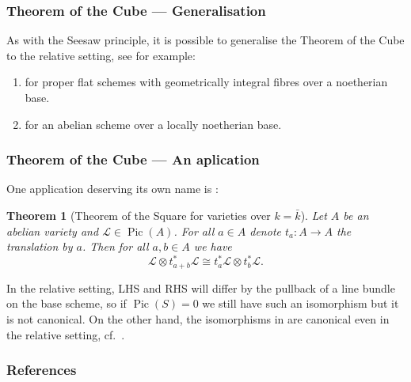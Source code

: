 \documentclass[notheorems, hyperref]{beamer}
\theoremstyle{darkgreentheorem}
\newtheorem{thm}{Theorem}
\theoremstyle{darkbluedefinition}
\theoremstyle{darkredexample}
\theoremstyle{remark}
\DeclareMathOperator{\Pic}{Pic}
\newcommand{\ot}{\otimes}
\renewcommand{\L}{\mathcal{L}}
\begin{document}
\begin{frame}
    \frametitle{Theorem of the Cube --- Generalisation}
    As with the Seesaw principle, it is possible to generalise the Theorem of the Cube to the relative setting, see for example:
    \begin{enumerate}[label=\textbullet]
	\item \cite[Corollary 6.8]{bha17} for proper flat schemes with geometrically integral fibres over a noetherian base.
	\item \cite[Theorem 9]{fra18} for an abelian scheme over a locally noetherian base.
    \end{enumerate}
\end{frame}

\begin{frame}
    \frametitle{Theorem of the Cube --- An aplication}
    One application deserving its own name is \cite[Theorem I.5.5]{mil08}:
    \begin{thm}[Theorem of the Square for varieties over $k=\bar{k}$]
	Let $A$ be an abelian variety and $\L\in \Pic(A)$.
	For all $a\in A$ denote $t_{a}\colon A\to A$ the translation by $a$.
	Then for all $a,b\in A$ we have
	\[ \L\ot t^{*}_{a+b}\L \cong t^{*}_{a}\L\ot t^{*}_{b}\L. \]
    \end{thm}
    \pause

    \marginnote{\dbend} In the relative setting, LHS and RHS will differ by the pullback of a line bundle on the base scheme, so if $\Pic(S)=0$ we still have such an isomorphism but it is not canonical.
    On the other hand, the isomorphisms in \cite[Corollaries I.5.2--I.5.4]{mil08} are canonical even in the relative setting, cf.~\cite[Corollaries to Theorem 9]{fra18}.
\end{frame}

\begin{frame}
    \frametitle{References}
    
    
\end{frame}
\end{document}
